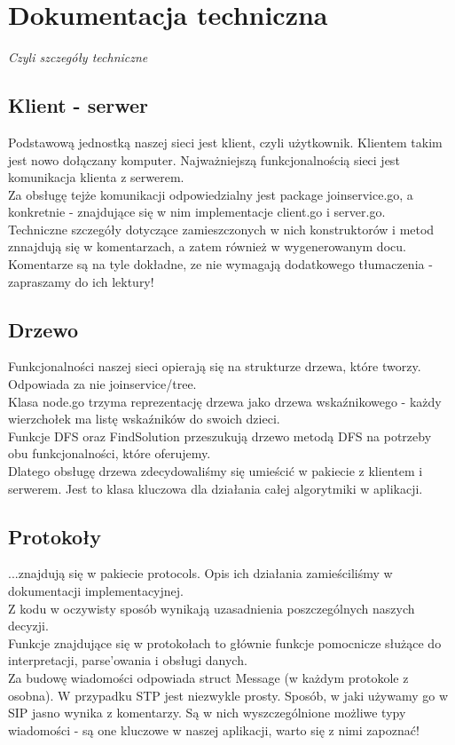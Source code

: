 \section{Dokumentacja techniczna}

\begin{center}
\textit{Czyli szczegóły techniczne}
\end{center}

\subsection{Klient - serwer}
Podstawową jednostką naszej sieci jest klient, czyli użytkownik. Klientem takim jest nowo dołączany komputer. Najważniejszą funkcjonalnością sieci jest komunikacja klienta z serwerem.\\
\indent Za obsługę tejże komunikacji odpowiedzialny jest package joinservice.go, a konkretnie - znajdujące się w nim implementacje client.go i server.go.\\
\indent Techniczne szczegóły dotyczące zamieszczonych w nich konstruktorów i metod znnajdują się w komentarzach, a zatem również w wygenerowanym docu. Komentarze są na tyle dokładne, ze nie wymagają dodatkowego tłumaczenia - zapraszamy do ich lektury!

\subsection{Drzewo}
Funkcjonalności naszej sieci opierają się na strukturze drzewa, które tworzy. Odpowiada za nie joinservice/tree.\\
\indent Klasa node.go trzyma reprezentację drzewa jako drzewa wskaźnikowego - każdy wierzchołek ma listę wskaźników do swoich dzieci.\\
\indent Funkcje DFS oraz FindSolution przeszukują drzewo metodą DFS na potrzeby obu funkcjonalności, które oferujemy.\\
\indent Dlatego obsługę drzewa zdecydowaliśmy się umieścić w pakiecie z klientem i serwerem. Jest to klasa kluczowa dla działania całej algorytmiki w aplikacji.

\subsection{Protokoły}
...znajdują się w pakiecie protocols. Opis ich działania zamieściliśmy w dokumentacji implementacyjnej.\\
\indent Z kodu w oczywisty sposób wynikają uzasadnienia poszczególnych naszych decyzji.\\
\indent Funkcje znajdujące się w protokołach to głównie funkcje pomocnicze służące do interpretacji, parse'owania i obsługi danych.\\
\indent Za budowę wiadomości odpowiada struct Message (w każdym protokole z osobna). W przypadku STP jest niezwykle prosty. Sposób, w jaki używamy go w SIP jasno wynika z komentarzy. Są w nich wyszczególnione możliwe typy wiadomości - są one kluczowe w naszej aplikacji, warto się z nimi zapoznać!


